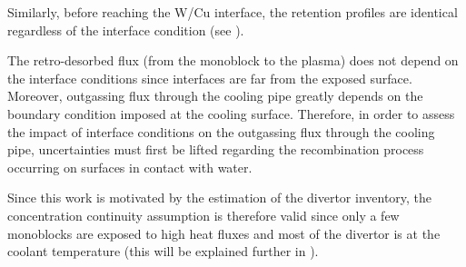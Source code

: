 Similarly, before reaching the W/Cu interface, the retention profiles are identical regardless of the interface condition (see ).

The retro-desorbed flux (from the monoblock to the plasma) does not depend on the interface conditions since interfaces are far from the exposed surface.
Moreover, outgassing flux through the cooling pipe greatly depends on the boundary condition imposed at the cooling surface.
Therefore, in order to assess the impact of interface conditions on the outgassing flux through the cooling pipe, uncertainties must first be lifted regarding the recombination process occurring on surfaces in contact with water.

Since this work is motivated by the estimation of the divertor inventory, the concentration continuity assumption is therefore valid since only a few monoblocks are exposed to high heat fluxes and most of the divertor is at the coolant temperature (this will be explained further in ).
